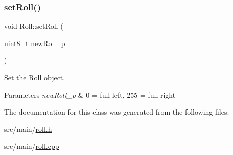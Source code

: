 \subsubsection{\texorpdfstring{set\+Roll()}{setRoll()}}
{\footnotesize\ttfamily void Roll\+::set\+Roll (\begin{DoxyParamCaption}\item[{uint8\+\_\+t}]{new\+Roll\+\_\+p }\end{DoxyParamCaption})}



Set the \hyperlink{class_roll}{Roll} object. 


\begin{DoxyParams}{Parameters}
{\em new\+Roll\+\_\+p} & 0 = full left, 255 = full right \\
\hline
\end{DoxyParams}


The documentation for this class was generated from the following files\+:\begin{DoxyCompactItemize}
\item 
src/main/\hyperlink{roll_8h}{roll.\+h}\item 
src/main/\hyperlink{roll_8cpp}{roll.\+cpp}\end{DoxyCompactItemize}
